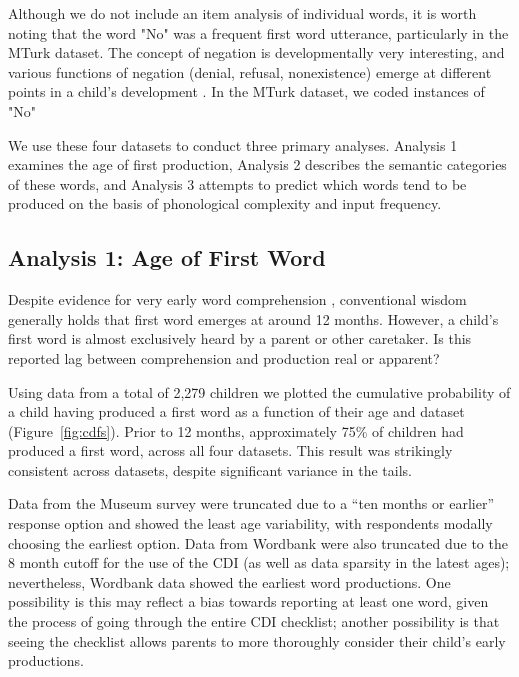 \documentclass[10pt,letterpaper]{article}
\begin{document}
Although we do not include an item analysis of individual words, it is worth noting that the word "No" was a frequent first word utterance, particularly in the MTurk dataset. The concept of negation is developmentally very interesting, and various functions of negation (denial, refusal, nonexistence) emerge at different points in a child's development \cite{pea1982}. In the MTurk dataset, we coded instances of "No" 

We use these four datasets to conduct three primary analyses. Analysis 1 examines the age of first production, Analysis 2 describes the semantic categories of these words, and Analysis 3 attempts to predict which words tend to be produced on the basis of phonological complexity and input frequency.

\subsection{Analysis 1: Age of First Word} 

Despite evidence for very early word comprehension \cite{tincoff1999,tincoff2012,bergelson2012}, conventional wisdom generally holds that first word emerges at around 12 months. However, a child's first word is almost exclusively heard by a parent or other caretaker. Is this reported lag between comprehension and production real or apparent? 

Using data from a total of 2,279 children we plotted the cumulative probability of a child having produced a first word as a function of their age and dataset (Figure~\ref{fig:cdfs}). Prior to 12 months, approximately 75\% of children had produced a first word, across all four datasets. This result was strikingly consistent across datasets, despite significant variance in the tails. 

Data from the Museum survey were truncated due to a ``ten months or earlier'' response option and showed the least age variability, with respondents modally choosing the earliest option. Data from Wordbank were also truncated due to the 8 month cutoff for the use of the CDI (as well as data sparsity in the latest ages); nevertheless, Wordbank data showed the earliest word productions. One possibility is this may reflect a bias towards reporting at least one word, given the process of going through the entire CDI checklist; another possibility is that seeing the checklist allows parents to more thoroughly consider their child's early productions. 
\end{document}
